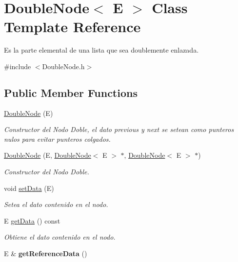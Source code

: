\hypertarget{class_double_node}{\section{Double\-Node$<$ E $>$ Class Template Reference}
\label{class_double_node}
}


Es la parte elemental de una lista que sea doublemente enlazada.  




{\ttfamily \#include $<$Double\-Node.\-h$>$}

\subsection*{Public Member Functions}
\begin{DoxyCompactItemize}
\item 
\hyperlink{class_double_node_a915ac8a626f09ec53db64b7c5b294b2d}{Double\-Node} (E)
\begin{DoxyCompactList}\small\item\em Constructor del Nodo Doble, el dato previous y next se setean como punteros nulos para evitar punteros colgados. \end{DoxyCompactList}\item 
\hyperlink{class_double_node_a53d29dbf397d39b420f64ab943b62cee}{Double\-Node} (E, \hyperlink{class_double_node}{Double\-Node}$<$ E $>$ $\ast$, \hyperlink{class_double_node}{Double\-Node}$<$ E $>$ $\ast$)
\begin{DoxyCompactList}\small\item\em Constructor del Nodo Doble. \end{DoxyCompactList}\item 
void \hyperlink{class_double_node_a21f86a81b7d4e4db966e07ce06da4f3a}{set\-Data} (E)
\begin{DoxyCompactList}\small\item\em Setea el dato contenido en el nodo. \end{DoxyCompactList}\item 
E \hyperlink{class_double_node_a59310f31d21f431febc4d329e1f10699}{get\-Data} () const 
\begin{DoxyCompactList}\small\item\em Obtiene el dato contenido en el nodo. \end{DoxyCompactList}\item 
\hypertarget{class_double_node_ac6b096a9a3a404f73e26b7319372fcbb}{E \& {\bfseries get\-Reference\-Data} ()}\label{class_double_node_ac6b096a9a3a404f73e26b7319372fcbb}


\end{DoxyCompactItemize}
